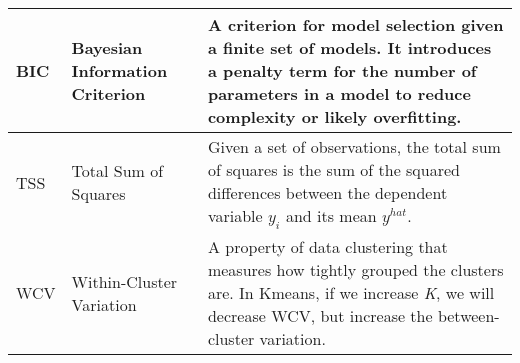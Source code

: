 \begin{table}[H]
\begin{tabularx}{\linewidth}{|l|l|X|}
		BIC						& Bayesian Information Criterion	& A criterion for model selection given a finite set of models. It introduces a penalty term for the number of parameters in a model to reduce complexity or likely overfitting.\\ \hline
		TSS						& Total Sum of Squares				& Given a set of observations, the total sum of squares is the sum of the squared differences between the dependent variable $y_i $ and its mean $y^{hat}$. \\ \hline
		WCV						& Within-Cluster Variation			& A property of data clustering that measures how tightly grouped the clusters are. In Kmeans, if we increase \textit{K}, we will decrease WCV, but increase the between-cluster variation. \\ \hline
	\end{tabularx}
	\label{tab:glossary}
\end{table}